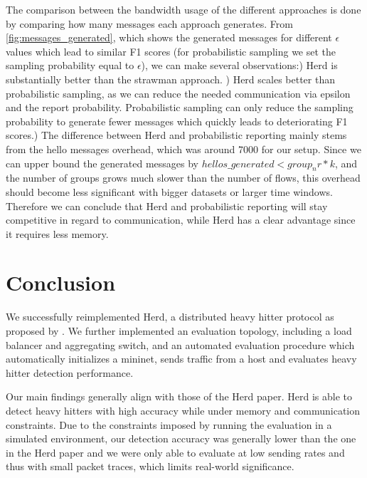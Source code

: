 \documentclass[11pt,oneside,a4paper]{article}
\begin{document}
The comparison between the bandwidth usage of the different approaches is done by comparing how many messages each approach generates. From \ref{fig:messages_generated}, which shows the generated messages for different $\epsilon$ values which lead to similar F1 scores (for probabilistic sampling we set the sampling probability equal to $\epsilon$), we can make several observations:) Herd is substantially better than the strawman approach. ) Herd scales better than probabilistic sampling, as we can reduce the needed communication via epsilon and the report probability. Probabilistic sampling can only reduce the sampling probability to generate fewer messages which quickly leads to deteriorating F1 scores.) The difference between Herd and probabilistic reporting mainly stems from the hello messages overhead, which was around 7000 for our setup. Since we can upper bound the generated messages by $hellos\_generated < group_nr * k$, and the number of groups grows much slower than the number of flows, this overhead should become less significant with bigger datasets or larger time windows. Therefore we can conclude that Herd and probabilistic reporting will stay competitive in regard to communication, while Herd has a clear advantage since it requires less memory.

\section{Conclusion}


We successfully reimplemented Herd, a distributed heavy hitter protocol as proposed by \cite{anon2019herd}. We further implemented an evaluation topology, including a load balancer and aggregating switch, and an automated evaluation procedure which automatically initializes a mininet, sends traffic from a host and evaluates heavy hitter detection performance.

\noindent Our main findings generally align with those of the Herd paper. Herd is able to detect heavy hitters with high accuracy while under memory and communication constraints. Due to the constraints imposed by running the evaluation in a simulated environment, our detection accuracy was generally lower than the one in the Herd paper and we were only able to evaluate at low sending rates and thus with small packet traces, which limits  real-world significance.
\end{document}
